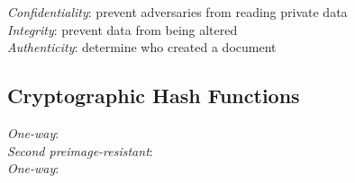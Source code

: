 \documentclass[10pt,landscape]{article}
\begin{document}
\begin{multicols}{3}
\textit{Confidentiality}: prevent adversaries from reading private data \\
\textit{Integrity}: prevent data from being altered \\
\textit{Authenticity}: determine who created a document

\subsection{Cryptographic Hash Functions}

\textit{One-way}: \\
\textit{Second preimage-resistant}: \\
\textit{One-way}: \\



\end{multicols}
\end{document}
